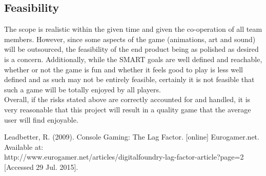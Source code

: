 \documentclass[a4paper,10pt]{article}
\begin{document}
		\subsection{Feasibility}
		The scope is realistic within the given time and given the co-operation of all team members. However, since some aspects of the game (animations, art and sound) will be outsourced, the feasibility of the end product being as polished as desired is a concern. Additionally, while the SMART goals are well defined and reachable, whether or not the game is fun and whether it feels good to play is less well defined and as such may not be entirely feasible, certainly it is not feasible that such a game will be totally enjoyed by all players.
		\smallskip\\
		Overall, if the risks stated above are correctly accounted for and handled, it is very reasonable that this project will result in a quality game that the average user will find enjoyable.
		\newpage

		\begin{thebibliography}{9}
			 Leadbetter, R. (2009). Console Gaming: The Lag Factor. [online] Eurogamer.net. Available at: \\http://www.eurogamer.net/articles/digitalfoundry-lag-factor-article?page=2 [Accessed 29 Jul. 2015].
		\end{thebibliography}
	
\end{document}
